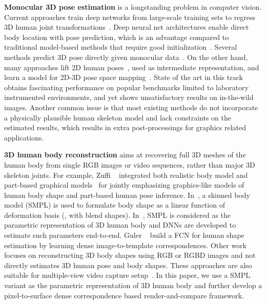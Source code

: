 \documentclass[10pt,twocolumn,letterpaper]{article}
\begin{document}
\textbf{Monocular 3D pose estimation} is a longstanding problem in computer vision. Current approaches train deep networks from large-scale training sets to regress 3D human joint transformations~\cite{ionescu2014human3,li2015maximum}. Deep neural net architectures enable direct body location with pose prediction, which is an advantage compared to traditional model-based methods that require good initialization~\cite{bogo2016keep,lassner2017unite}. Several methods predict 3D pose directly given monocular data~\cite{tekin2016structured,pavlakos2017volumetric,Sun2017,Nie2017,diogoCVPR182d3dml,mirECCV18temp3dpose,umarECCV1825Dhtmp3dpose,helgeECCV18GeoAware}. On the other hand, many approaches lift 2D human poses~\cite{fang2017rmpe,cao2017realtime}, used as intermediate representation, and learn a model for 2D-3D pose space mapping~\cite{yasin2016dual,zhou2016sparseness,zhou2017towards,martinez2017simple,Fang2018}. State of the art in this track obtains fascinating performance on popular benchmarks limited to laboratory instrumented environments, and yet shows unsatisfactory results on in-the-wild images. Another common issue is that most existing methods do not incorporate a physically plausible human skeleton model and lack constraints on the estimated results, which results in extra post-processings for graphics related applications.

\textbf{3D human body reconstruction} aims at recovering full 3D meshes of the human body from single RGB images or video sequences, rather than major 3D skeleton joints. For example, Zuffi \etal~\cite{zuffi2015stitched} integrated both realistic body model and part-based graphical models~\cite{xu2013reid,XuFashionCVPR2018,xu2018caog} for jointly emphasizing graphics-like models of human body shape and part-based human pose inference.
In~\cite{loper2015smpl,bogo2016keep,lassner2017unite,tung2017self}, a skinned body model (SMPL) is used to formulate body shape as a linear function of deformation basis (\ie, with blend shapes). In~\cite{TanBC17,pavlakos2018ps,kanazawa2018hmr,NeuralBodyFit18}, SMPL is considered as the parametric representation of 3D human body and DNNs are developed to estimate such parameters end-to-end. Guler \etal~\cite{guler2017densereg,DensePose2018} build a FCN for human shape estimation by learning dense image-to-template correspondences. Other work~\cite{HSNetsl16,varol18_bodynet,ShapeFMask18Arxiv} focuses on reconstructing 3D body shapes using RGB or RGBD images and not directly estimates 3D human pose and body shapes.
These approaches are also suitable for multiple-view video capture setup~\cite{3Dvideo12,tungICCV09}.
In this paper, we use a SMPL variant as the parametric representation of 3D human body and further develop a pixel-to-surface dense correspondence based render-and-compare framework.
\end{document}
